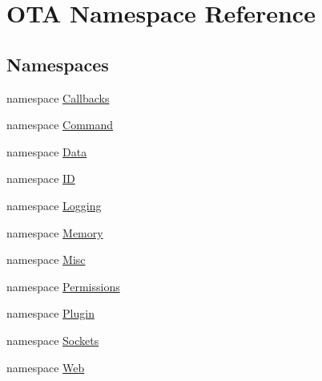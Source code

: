 \hypertarget{namespaceOTA}{}\section{O\+T\+A Namespace Reference}
\label{namespaceOTA}
\subsection*{Namespaces}
\begin{DoxyCompactItemize}
\item 
namespace \hyperlink{namespaceOTA_1_1Callbacks}{Callbacks}
\item 
namespace \hyperlink{namespaceOTA_1_1Command}{Command}
\item 
namespace \hyperlink{namespaceOTA_1_1Data}{Data}
\item 
namespace \hyperlink{namespaceOTA_1_1ID}{I\+D}
\item 
namespace \hyperlink{namespaceOTA_1_1Logging}{Logging}
\item 
namespace \hyperlink{namespaceOTA_1_1Memory}{Memory}
\item 
namespace \hyperlink{namespaceOTA_1_1Misc}{Misc}
\item 
namespace \hyperlink{namespaceOTA_1_1Permissions}{Permissions}
\item 
namespace \hyperlink{namespaceOTA_1_1Plugin}{Plugin}
\item 
namespace \hyperlink{namespaceOTA_1_1Sockets}{Sockets}
\item 
namespace \hyperlink{namespaceOTA_1_1Web}{Web}
\end{DoxyCompactItemize}
